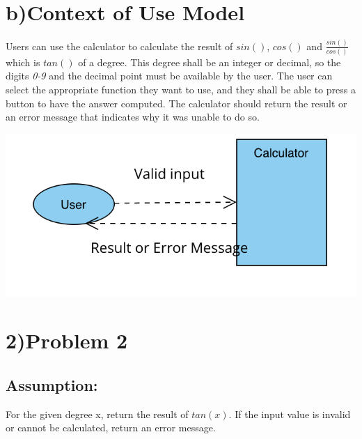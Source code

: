 \documentclass[letterpaper, 11pt]{report}
\begin{document}
\pagebreak
\newpage
{}
\section*{b)Context of Use Model}
\normalsize{Users can use the calculator to calculate the result of $sin()$, $cos()$ and $\frac{sin()}{cos()}$ which is $tan()$ of a degree. This degree shall be an integer or decimal, so the digits \textit{0-9} and the decimal point must be available by the user. The user can select the appropriate function they want to use, and they shall be able to press a button to have the answer computed. The calculator should return the result or an error message that indicates why it was unable to do so.}
\begin{center}
\includegraphics[width=15cm]{context_diagram}
\end{center}
\pagebreak
\newpage
{}
\section*{2)Problem 2}
\subsection*{Assumption:} 
 For the given degree x, return the result of $tan(x)$. If the input value is invalid or cannot be calculated, return an error message.

\\
\end{document}
